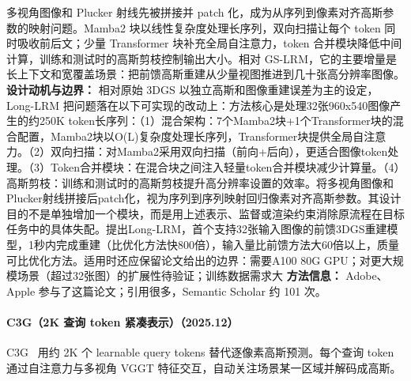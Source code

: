 多视角图像和 Plucker 射线先被拼接并 patch 化，成为从序列到像素对齐高斯参数的映射问题。Mamba2 块以线性复杂度处理长序列，双向扫描让每个 token 同时吸收前后文；少量 Transformer 块补充全局自注意力，token 合并模块降低中间计算，训练和测试时的高斯剪枝控制输出大小。相对 GS-LRM，它的主要增量是长上下文和宽覆盖场景：把前馈高斯重建从少量视图推进到几十张高分辨率图像。
\textbf{设计动机与边界：} 相对原始 3DGS 以独立高斯和图像重建误差为主的设定，Long-LRM 把问题落在以下可实现的改动上：方法核心是处理32张960x540图像产生的约250K token长序列：（1）混合架构：7个Mamba2块+1个Transformer块的混合配置，Mamba2块以O(L)复杂度处理长序列，Transformer块提供全局自注意力。（2）双向扫描：对Mamba2采用双向扫描（前向+后向），更适合图像token处理。（3）Token合并模块：在混合块之间注入轻量token合并模块减少计算量。（4）高斯剪枝：训练和测试时的高斯剪枝提升高分辨率设置的效率。将多视角图像和Plucker射线拼接后patch化，视为序列到序列映射回归像素对齐高斯参数。其设计目的不是单独增加一个模块，而是用上述表示、监督或渲染约束消除原流程在目标任务中的具体失配。提出Long-LRM，首个支持32张输入图像的前馈3DGS重建模型，1秒内完成重建（比优化方法快800倍），输入量比前馈方法大60倍以上，质量可比优化方法。适用时还应保留论文给出的边界：需要A100 80G GPU；对更大规模场景（超过32张图）的扩展性待验证；训练数据需求大
\textbf{方法信息：} Adobe、Apple 参与了这篇论文；引用很多，Semantic Scholar 约 101 次。



\paragraph{C3G（2K 查询 token 紧凑表示）（2025.12）}
C3G~\cite{2512_04021} 用约 2K 个 learnable query tokens 替代逐像素高斯预测。每个查询 token 通过自注意力与多视角 VGGT 特征交互，自动关注场景某一区域并解码成高斯。

